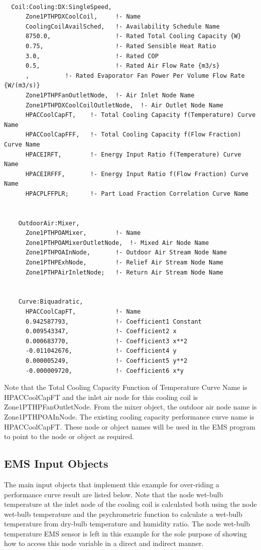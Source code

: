 \begin{lstlisting}

  Coil:Cooling:DX:SingleSpeed,
      Zone1PTHPDXCoolCoil,     !- Name
      CoolingCoilAvailSched,   !- Availability Schedule Name
      8750.0,                  !- Rated Total Cooling Capacity {W}
      0.75,                    !- Rated Sensible Heat Ratio
      3.0,                     !- Rated COP
      0.5,                     !- Rated Air Flow Rate {m3/s}
      ,          !- Rated Evaporator Fan Power Per Volume Flow Rate {W/(m3/s)}
      Zone1PTHPFanOutletNode,  !- Air Inlet Node Name
      Zone1PTHPDXCoolCoilOutletNode,  !- Air Outlet Node Name
      HPACCoolCapFT,    !- Total Cooling Capacity f(Temperature) Curve Name
      HPACCoolCapFFF,   !- Total Cooling Capacity f(Flow Fraction) Curve Name
      HPACEIRFT,        !- Energy Input Ratio f(Temperature) Curve Name
      HPACEIRFFF,       !- Energy Input Ratio f(Flow Fraction) Curve Name
      HPACPLFFPLR;      !- Part Load Fraction Correlation Curve Name


    OutdoorAir:Mixer,
      Zone1PTHPOAMixer,        !- Name
      Zone1PTHPOAMixerOutletNode,  !- Mixed Air Node Name
      Zone1PTHPOAInNode,       !- Outdoor Air Stream Node Name
      Zone1PTHPExhNode,        !- Relief Air Stream Node Name
      Zone1PTHPAirInletNode;   !- Return Air Stream Node Name


    Curve:Biquadratic,
      HPACCoolCapFT,           !- Name
      0.942587793,             !- Coefficient1 Constant
      0.009543347,             !- Coefficient2 x
      0.000683770,             !- Coefficient3 x**2
      -0.011042676,            !- Coefficient4 y
      0.000005249,             !- Coefficient5 y**2
      -0.000009720,            !- Coefficient6 x*y
\end{lstlisting}

Note that the Total Cooling Capacity Function of Temperature Curve Name is HPACCoolCapFT and the inlet air node for this cooling coil is Zone1PTHPFanOutletNode. From the mixer object, the outdoor air node name is Zone1PTHPOAInNode. The existing cooling capacity performance curve name is HPACCoolCapFT. These node or object names will be used in the EMS program to point to the node or object as required.

\subsection{EMS Input Objects}\label{ems-input-objects-001}

The main input objects that implement this example for over-riding a performance curve result are listed below. Note that the node wet-bulb temperature at the inlet node of the cooling coil is calculated both using the node wet-bulb temperature and the psychrometric function to calculate a wet-bulb temperature from dry-bulb temperature and humidity ratio. The node wet-bulb temperature EMS sensor is left in this example for the sole purpose of showing how to access this node variable in a direct and indirect manner.

